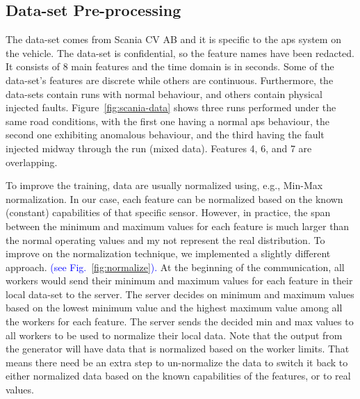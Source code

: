 




\subsection{Data-set Pre-processing}
\label{sec:data-pre-process}
%
 The data-set comes from Scania CV AB and it is specific to the \gls*{aps} system on the vehicle. The data-set is confidential, so the feature names have been redacted. It consists of 8 main features and the time domain is in seconds. Some of the data-set's features are discrete while others are continuous. Furthermore, the data-sets contain runs with normal behaviour, and others contain physical injected faults.
%
Figure~\ref{fig:scania-data} shows three runs performed under the same road conditions, with the first one having a normal \gls*{aps} behaviour, the second one exhibiting anomalous behaviour, and the third having the fault injected midway through the run (mixed data). Features 4, 6, and 7 are overlapping.



To improve the training, data are usually normalized using, e.g., Min-Max normalization. In our case, each feature can be normalized based on the known (constant) capabilities of that specific sensor. %
However, in practice, the span between the minimum and maximum values for each feature is much larger than the normal operating values and my not represent the real distribution.
%
To improve on the normalization technique, we implemented a slightly different approach. \textcolor{blue}{(see Fig.~\ref{fig:normalize}). }
At the beginning of the communication, all workers would send their minimum and maximum values for each feature in their local data-set to the server. The server decides on minimum and maximum values based on the lowest minimum value and the highest maximum value among all the workers for each feature. The server sends the decided min and max values to all workers to be used to normalize their local data. Note that the output from the generator will have data that is normalized based on the worker limits. That means there need be an extra step to un-normalize the data to switch it back to either normalized data based on the known capabilities of the features, or to real values.
\newcommand\normscale{0.6}


